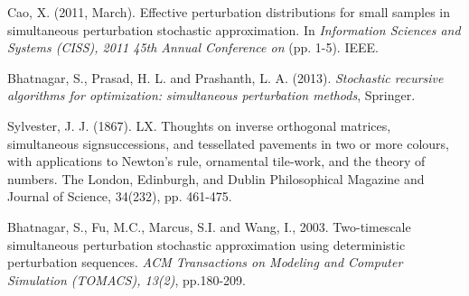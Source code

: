 \documentclass[conference]{IEEEtran}
\begin{document}
\begin{thebibliography}{1}
Cao, X. (2011, March). Effective perturbation distributions for small samples in simultaneous perturbation stochastic approximation. In \textit{Information Sciences and Systems (CISS), 2011 45th Annual Conference on} (pp. 1-5). IEEE.


 Bhatnagar, S., Prasad,
  H. L. and Prashanth, L. A. (2013). \textit{Stochastic recursive
    algorithms for optimization: simultaneous perturbation methods},
  Springer.

 Sylvester,
  J. J. (1867). LX. Thoughts on inverse orthogonal matrices,
  simultaneous signsuccessions, and tessellated pavements in two or more
  colours, with applications to Newton's rule, ornamental tile-work, and
  the theory of numbers. The London, Edinburgh, and Dublin Philosophical
  Magazine and Journal of Science, 34(232), pp. 461-475.

Bhatnagar, S., Fu, M.C., Marcus, S.I. and Wang, I., 2003. Two-timescale simultaneous perturbation stochastic approximation using deterministic perturbation sequences. \textit{ACM Transactions on Modeling and Computer Simulation (TOMACS), 13(2)}, pp.180-209.

\end{thebibliography}
\end{document}

